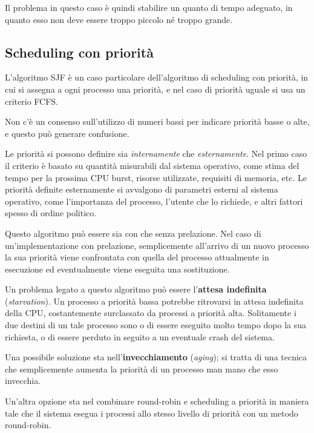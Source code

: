         Il problema in questo caso è quindi stabilire un quanto di tempo adeguato, in quanto esso non deve essere troppo piccolo né troppo grande.
        
    \subsection{Scheduling con priorità}
        L'algoritmo SJF è un caso particolare dell'algoritmo di scheduling con priorità, in cui si assegna a ogni processo una priorità, e nel caso di priorità uguale si usa un criterio FCFS.
        
        Non c'è un consenso sull'utilizzo di numeri bassi per indicare priorità basse o alte, e questo può generare confusione.
        
        Le priorità si possono definire sia \textit{internamente} che \textit{esternamente}. Nel primo caso il criterio è basato su quantità misurabili dal sistema operativo, come stima del tempo per la prossima CPU burst, risorse utilizzate, requisiti di memoria, etc. Le priorità definite esternamente si avvalgono di parametri esterni al sistema operativo, come l'importanza del processo, l'utente che lo richiede, e altri fattori spesso di ordine politico.
        
        Questo algoritmo può essere sia con che senza prelazione. Nel caso di un'implementazione con prelazione, semplicemente all'arrivo di un nuovo processo la sua priorità viene confrontata con quella del processo attualmente in esecuzione ed eventualmente viene eseguita una sostituzione.
        
        Un problema legato a questo algoritmo può essere l'\textbf{attesa indefinita} (\textit{starvation}). Un processo a priorità bassa potrebbe ritrovarsi in attesa indefinita della CPU, costantemente surclassato da processi a priorità alta. Solitamente i due destini di un tale processo sono o di essere eseguito molto tempo dopo la sua richiesta, o di essere perduto in seguito a un eventuale crash del sistema.
        
        Una possibile soluzione sta nell'\textbf{invecchiamento} (\textit{aging}); si tratta di una tecnica che semplicemente aumenta la priorità di un processo man mano che esso invecchia.
        
        Un'altra opzione sta nel combinare round-robin e scheduling a priorità in maniera tale che il sistema esegua i processi allo stesso livello di priorità con un metodo round-robin.
        
